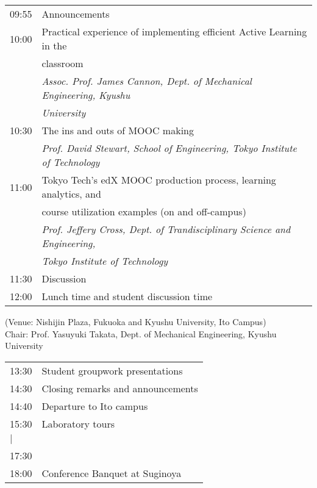 \noindent\begin{tabular}{|l|l|}
    \hline
    09:55   & Announcements \\
    10:00   & Practical experience of implementing efficient Active Learning in the\\
            & classroom \\
            & \emph{Assoc. Prof. James Cannon, Dept. of Mechanical Engineering, Kyushu}\\
            & \emph{University} \\
    10:30   & The ins and outs of MOOC making \\
            & \emph{Prof. David Stewart, School of Engineering, Tokyo Institute of Technology} \\
    11:00   & Tokyo Tech’s edX MOOC production process, learning analytics, and\\
            & course utilization examples (on and off-campus) \\
            & \emph{Prof. Jeffery Cross, Dept. of Trandisciplinary Science and Engineering,} \\
            & \emph{Tokyo Institute of Technology} \\
    11:30   & Discussion \\
    12:00   & Lunch time and student discussion time \\

    \hline
\end{tabular}

\vspace*{3ex}
 (Venue: Nishijin Plaza, Fukuoka and Kyushu University, Ito Campus) \\
Chair: Prof. Yasuyuki Takata, Dept. of Mechanical Engineering, Kyushu University

\noindent\begin{tabular}{|l|l|}
    \hline
    13:30   & Student groupwork presentations \\
    14:30   & Closing remarks and announcements \\
    14:40   & Departure to Ito campus \\
    15:30   & Laboratory tours \\ %
    \hspace{1em}$\mid$  & \\
    17:30   & \\
    18:00   & Conference Banquet at Suginoya \\
    \hline
\end{tabular}


